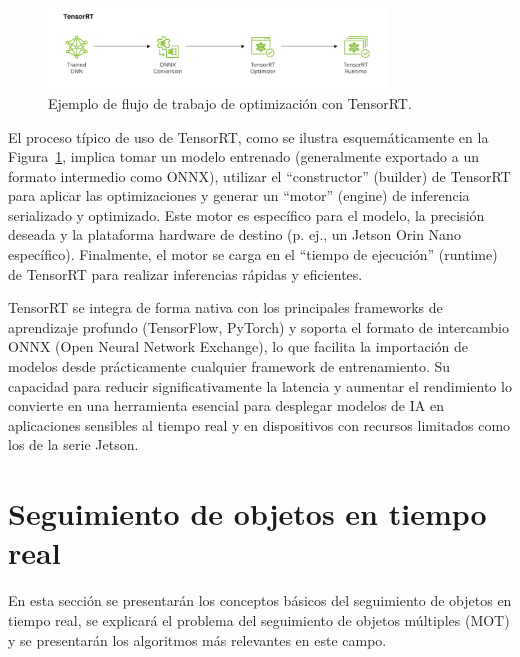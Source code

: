 \documentclass[11pt,spanish,listoffigures,listoftables]{tfgetsinf}
\begin{document}
\begin{figure}[H]
   \centering
   \includegraphics[width=0.8\textwidth]{images/estado_del_arte/TensorRT_pipeline.png}
   \caption{Ejemplo de flujo de trabajo de optimización con TensorRT.}
   \label{fig:tensorrt_architecture}
\end{figure}

El proceso típico de uso de TensorRT, como se ilustra esquemáticamente en la Figura~\ref{fig:tensorrt_architecture}, implica tomar un modelo entrenado (generalmente exportado a un formato intermedio como ONNX), utilizar el ``constructor'' (builder) de TensorRT para aplicar las optimizaciones y generar un ``motor'' (engine) de inferencia serializado y optimizado. Este motor es específico para el modelo, la precisión deseada y la plataforma hardware de destino (p. ej., un Jetson Orin Nano específico). Finalmente, el motor se carga en el ``tiempo de ejecución'' (runtime) de TensorRT para realizar inferencias rápidas y eficientes.

TensorRT se integra de forma nativa con los principales frameworks de aprendizaje profundo (TensorFlow, PyTorch) y soporta el formato de intercambio ONNX (Open Neural Network Exchange), lo que facilita la importación de modelos desde prácticamente cualquier framework de entrenamiento. Su capacidad para reducir significativamente la latencia y aumentar el rendimiento lo convierte en una herramienta esencial para desplegar modelos de IA en aplicaciones sensibles al tiempo real y en dispositivos con recursos limitados como los de la serie Jetson.



\section{Seguimiento de objetos en tiempo real} \label{sec:mot}
En esta sección se presentarán los conceptos básicos del seguimiento de objetos en tiempo real, se explicará el problema del seguimiento de objetos múltiples (MOT) y se presentarán los algoritmos más relevantes en este campo.
\end{document}
